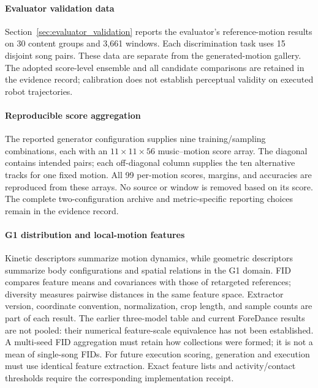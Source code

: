\paragraph{Evaluator validation data}
Section~\ref{sec:evaluator_validation} reports the evaluator's reference-motion
results on 30 content groups and 3,661 windows. Each discrimination task uses
15 disjoint song pairs. These data are separate from the generated-motion
gallery. The adopted score-level ensemble and all candidate comparisons are
retained in the evidence record; calibration does not establish perceptual
validity on executed robot trajectories.

\paragraph{Reproducible score aggregation}
The reported generator configuration supplies nine training/sampling
combinations, each with an $11\times11\times56$ music--motion score array.
The diagonal contains intended pairs; each off-diagonal column supplies the
ten alternative tracks for one fixed motion. All 99 per-motion scores,
margins, and accuracies are reproduced from these arrays. No source or window
is removed based on its score. The complete two-configuration archive and
metric-specific reporting choices remain in the evidence record.

\paragraph{G1 distribution and local-motion features}
Kinetic descriptors summarize motion dynamics, while geometric descriptors
summarize body configurations and spatial relations in the G1 domain.
FID compares feature means and covariances with those of retargeted references;
diversity measures pairwise distances in the same feature space. Extractor
version, coordinate convention, normalization, crop length, and sample counts
are part of each result. The earlier three-model table and current ForeDance
results are not pooled: their numerical feature-scale equivalence has not been
established. A multi-seed FID aggregation must retain how collections were formed;
it is not a mean of single-song FIDs. For future execution scoring, generation
and execution must use identical feature extraction. Exact feature lists and
activity/contact thresholds require the corresponding implementation receipt.

